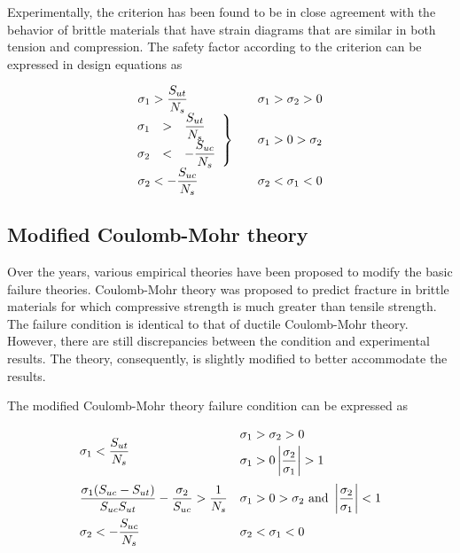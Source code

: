 \documentclass[
10pt,
a4paper,
openany,
svgnames,
]{book} %
\begin{document}
Experimentally, the criterion has been found to be in close agreement with the behavior of brittle materials that have strain diagrams that are similar in both tension and compression. The safety factor according to the criterion can be expressed in design equations as

\begin{equation}
  \begin{array}{l l l}
  \sigma_1 > \dfrac{S_{ut}}{N_s} & & \sigma_1 > \sigma_2 > 0 \\
  \left. \hspace{-0.23cm}
  \begin{array}{l l l}
    \sigma_1 & > & \dfrac{S_{ut}}{N_s} \\
    \sigma_2 & < & -\dfrac{S_{uc}}{N_s}
    \end{array} \right\} & & \sigma_1 > 0 > \sigma_2 \\
    \sigma_2 <  - \dfrac{S_{uc}}{N_s} & & \sigma _2 < \sigma _1 < 0
  \end{array}
\end{equation}

\subsection{Modified Coulomb-Mohr theory}

Over the years, various empirical theories have been proposed to modify the basic failure theories. Coulomb-Mohr theory was proposed to predict fracture in brittle materials for which compressive strength is much greater than tensile strength. The failure condition is identical to that of ductile Coulomb-Mohr theory. However, there are still discrepancies between the condition and experimental results. The theory, consequently, is slightly modified to better accommodate the results.

The modified Coulomb-Mohr theory failure condition can be expressed as

\begin{equation}
  \begin{array}{ll}
    \sigma_1 < \dfrac{S_{ut}}{N_s} &
      \begin{gathered}
        \sigma_1 > \sigma_2 > 0 \hfill \\ 
        \sigma_1 > 0 \left| \dfrac{\sigma_2}{\sigma_1} \right| > 1 
      \end{gathered} \\[20pt]
    \dfrac{\sigma_1(S_{uc} - S_{ut})}{S_{uc}S_{ut}} - \dfrac{\sigma_2}{S_{uc}} > \dfrac{1}{N_s} & \sigma_1 > 0 > \sigma_2\text{ and }\left| \dfrac{\sigma_2}{\sigma_1} \right| < 1 \\[10pt]
    \sigma_2 <  -\dfrac{S_{uc}}{N_s} & \sigma_2 < \sigma_1 < 0
  \end{array}
\end{equation}
\end{document}
